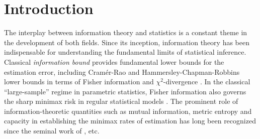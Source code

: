 \section{Introduction}
\label{sec:intro}
	
	


The interplay between information theory and statistics is a constant theme in the development of both fields.
Since its inception, information theory has been indispensable for understanding the fundamental limits of statistical inference.
Classical \emph{information bound} provides fundamental lower bounds for the estimation error, including Cram\'er-Rao and Hammersley-Chapman-Robbins lower bounds in terms of Fisher information and  $\chi^2$-divergence \cite{lehmann,BL91}. 
In the classical ``large-sample'' regime in parametric statistics, Fisher information also governs the sharp minimax risk in regular statistical models \cite{VdV00}. The prominent role of information-theoretic quantities such as mutual information, metric entropy and capacity in establishing the minimax rates of estimation has long been recognized since the seminal work of \cite{Lecam86,IKbook,Birge83,YB99}, etc. 




